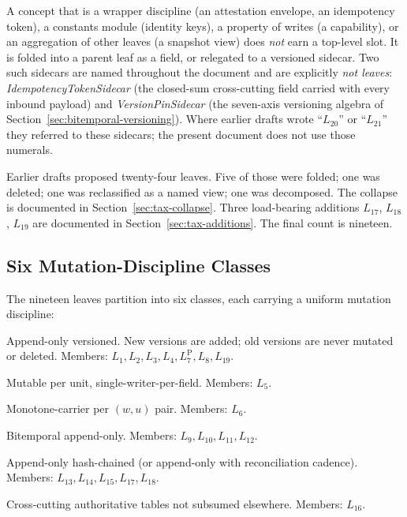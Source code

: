 \documentclass[11pt,a4paper]{article}
\begin{document}
A concept that is a wrapper discipline (an attestation envelope, an idempotency token), a constants module (identity keys), a property of writes (a capability), or an aggregation of other leaves (a snapshot view) does \emph{not} earn a top-level slot. It is folded into a parent leaf as a field, or relegated to a versioned sidecar. Two such sidecars are named throughout the document and are explicitly \emph{not leaves}: \emph{IdempotencyTokenSidecar} (the closed-sum cross-cutting field carried with every inbound payload) and \emph{VersionPinSidecar} (the seven-axis versioning algebra of Section~\ref{sec:bitemporal-versioning}). Where earlier drafts wrote ``$L_{20}$'' or ``$L_{21}$'' they referred to these sidecars; the present document does not use those numerals.

Earlier drafts proposed twenty-four leaves. Five of those were folded; one was deleted; one was reclassified as a named view; one was decomposed. The collapse is documented in Section~\ref{sec:tax-collapse}. Three load-bearing additions $L_{17}$, $L_{18}$, $L_{19}$ are documented in Section~\ref{sec:tax-additions}. The final count is nineteen.

\subsection{Six Mutation-Discipline Classes}
\label{sec:tax-classes}

The nineteen leaves partition into six classes, each carrying a uniform mutation discipline:

\begin{description}[style=nextline]
\item[$\mathcal{D}_1$ Definitions] Append-only versioned. New versions are added; old versions are never mutated or deleted. Members: $L_1, L_2, L_3, L_4, L_7^{\mathrm{P}}, L_8, L_{19}$.
\item[$\mathcal{D}_2$ Shared Status] Mutable per unit, single-writer-per-field. Members: $L_5$.
\item[$\mathcal{D}_3$ Per-Position State] Monotone-carrier per $(w, u)$ pair. Members: $L_6$.
\item[$\mathcal{D}_4$ Observations] Bitemporal append-only. Members: $L_9, L_{10}, L_{11}, L_{12}$.
\item[$\mathcal{D}_5$ Effects] Append-only hash-chained (or append-only with reconciliation cadence). Members: $L_{13}, L_{14}, L_{15}, L_{17}, L_{18}$.
\item[$\mathcal{D}_6$ Provenance] Cross-cutting authoritative tables not subsumed elsewhere. Members: $L_{16}$.
\end{description}
\end{document}
